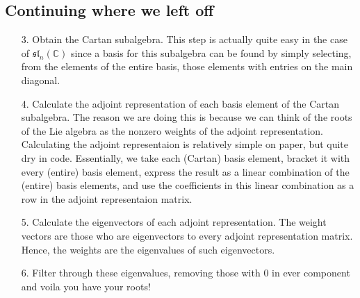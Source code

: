\documentclass[12pt]{article}
\theoremstyle{definition}
\theoremstyle{definition}
\begin{document}
    \subsection{Continuing where we left off}
    \begin{enumerate}
        \item[3.] Obtain the Cartan subalgebra. This step is actually quite
            easy in the case of $\mathfrak{sl}_n(\mathbb{C})$ since a basis for this
            subalgebra can be found by simply selecting, from the elements of the
            entire basis, those elements with entries on the main diagonal.
        \item[4.] Calculate the adjoint representation of each basis element of
            the Cartan subalgebra. The reason we are doing this is because we
            can think of the roots of the Lie algebra as the nonzero weights of
            the adjoint representation. Calculating the adjoint representaion
            is relatively simple on paper, but quite dry in code. Essentially,
            we take each (Cartan) basis element, bracket it with every (entire)
            basis element, express the result as a linear combination of the
            (entire) basis elements, and use the coefficients in this linear
            combination as a row in the adjoint representaion matrix.
        \item[5.] Calculate the eigenvectors of each adjoint representation.
            The weight vectors are those who are eigenvectors to every adjoint
            representation matrix. Hence, the weights are the eigenvalues of
            such eigenvectors.
        \item[6.] Filter through these eigenvalues, removing those with 0 in
            ever component and voila you have your roots!
    \end{enumerate}
\end{document}
